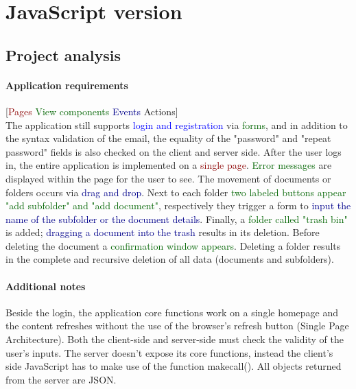 \documentclass[a4paper,12pt]{article}
\begin{document}
\newpage

\section{JavaScript version}
\subsection{Project analysis}
\paragraph{Application requirements}
[\textcolor{darkred}{Pages} \textcolor{darkgreen}{View components} \textcolor{darkblue}{Events} \textcolor{darkyellow}{Actions}]\\
The application still supports \textcolor{blue}{login and registration} via \textcolor{darkgreen}{forms}, and in addition to the \textcolor{darkyellow}{syntax validation of the email}, the \textcolor{darkyellow}{equality of the "password" and "repeat password" fields is also checked} on the client and server side. After the user logs in, the entire application is implemented on a \textcolor{darkred}{single page}. \textcolor{darkgreen}{Error messages} are displayed within the page for the user to see. The \textcolor{darkyellow}{movement of documents or folders} occurs via \textcolor{darkblue}{drag and drop}. Next to each folder \textcolor{darkgreen}{two labeled buttons appear "add subfolder" and "add document"}, respectively they \textcolor{darkyellow}{trigger a form} to \textcolor{darkblue}{input the name of the subfolder or the document details}. Finally, a \textcolor{darkgreen}{folder called "trash bin"} is added; \textcolor{darkblue}{dragging a document into the trash} results in \textcolor{darkyellow}{its deletion}. Before deleting the document a \textcolor{darkgreen}{confirmation window appears}. \textcolor{darkyellow}{Deleting a folder results in the complete and recursive deletion of all data (documents and subfolders)}.

\paragraph{Additional notes}
Beside the login, the application core functions work on a single homepage and the content refreshes without the use of the browser's refresh button (Single Page Architecture). Both the client-side and server-side must check the validity of the user's inputs. The server doesn't expose its core functions, instead the client's side JavaScript has to make use of the function makecall(). All objects returned from the server are JSON. 
\newpage
\end{document}

